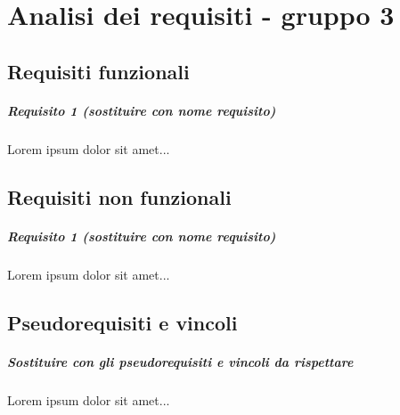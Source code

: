 
\chapter{Analisi dei requisiti - gruppo 3}
\label{ref:requisiti3}


\section{Requisiti funzionali}

\paragraph{Requisito 1 (sostituire con nome requisito) \\} 
Lorem ipsum dolor sit amet...

\section{Requisiti non funzionali}

\paragraph{Requisito 1 (sostituire con nome requisito) \\} 
Lorem ipsum dolor sit amet...

\section{Pseudorequisiti e vincoli}
\paragraph{Sostituire con gli pseudorequisiti e vincoli da rispettare \\}
Lorem ipsum dolor sit amet...

\newpage